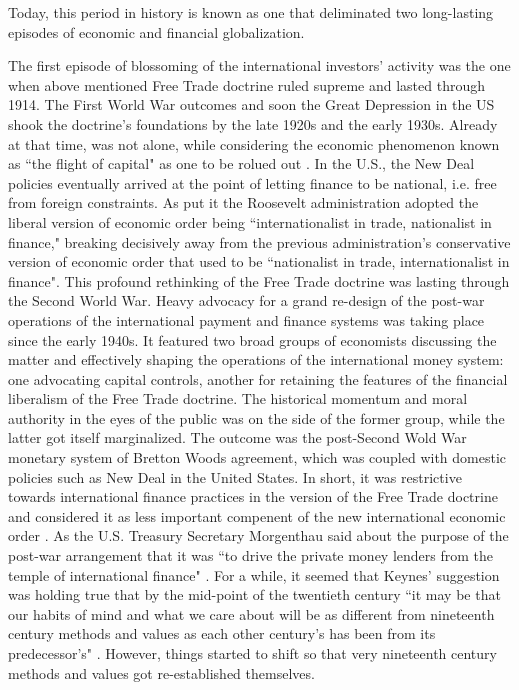 Today, this period in history is known as one that deliminated two long-lasting episodes of economic and financial globalization. 

The first episode of blossoming of the international investors' activity was the one when above mentioned Free Trade doctrine ruled supreme and lasted through 1914. The First World War outcomes and soon the Great Depression in the US shook the doctrine's foundations by the late  1920s and the early 1930s. Already at that time, \citeauthor{keynes1933} was not alone, while considering the economic phenomenon known as ``the flight of capital" as one to be rolued out \citep[p.~180]{keynes1933}. In the U.S., the New Deal policies eventually arrived at the point of letting finance to be national, i.e. free from foreign constraints. As \cite[p.~185]{schlesinger1958} put it the Roosevelt administration adopted the liberal version of economic order being ``internationalist in trade, nationalist in finance," breaking decisively away from the previous administration's conservative version of economic order that used to be ``nationalist in trade, internationalist in finance". This profound rethinking of the Free Trade doctrine was lasting through the Second World War. Heavy advocacy for a grand re-design of the post-war operations of the international payment and finance systems was taking place since the early 1940s. It featured two broad groups of economists discussing the matter and effectively shaping the operations of the international money system: one advocating capital controls, another for retaining the features of the financial liberalism of the Free Trade doctrine. The historical momentum and moral authority in the eyes of the public was on the side of the former group, while the latter got itself marginalized. The outcome was the post-Second Wold War monetary system of Bretton Woods agreement, which was coupled with domestic policies such as New Deal in the United States. In short, it was restrictive towards international finance practices in the version of the Free Trade doctrine and considered it as less important compenent of the new international economic order \citep[p.~50]{helleiner1994}. As the U.S. Treasury Secretary Morgenthau said about the purpose of the post-war arrangement that it was ``to drive the private money lenders from the temple of international finance" \citep{kregel2009}. For a while, it seemed that Keynes' suggestion was holding true that by the mid-point of the twentieth century ``it may be that our habits of mind and what we care about will be as different from nineteenth century methods and values as each other century's has been from its predecessor's" \citep[p.~178]{keynes1933}. However, things started to shift so that very nineteenth century methods and values got re-established themselves.

